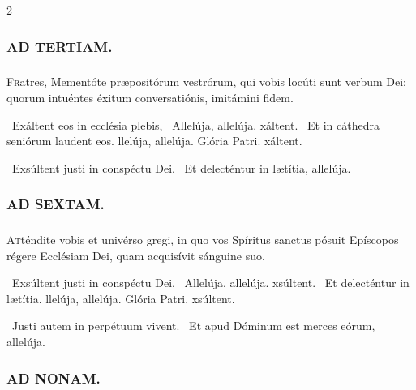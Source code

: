 \documentclass[9pt,twoside]{extarticle}
\begin{document}
\begin{multicols}{2}
\begin{tightlist}{}
\item {}
\end{tightlist}

\subsubsection*{\center \textsc{AD TERTIAM.}}
\subsubsection*{}
\lettrine{F}ratres, Mementóte præpositórum vestrórum, qui vobis locúti sunt verbum Dei: quorum intuéntes éxitum conversatiónis, imitámini fidem.

\begin{tightlist}{}
\item {}~Exáltent eos in ecclésia plebis, \textred{*}~Allelúja, allelúja. xáltent. ~Et in cáthedra seniórum laudent eos. llelúja, allelúja. Glória Patri. xáltent.
\item {}~Exsúltent justi in conspéctu Dei. ~Et delecténtur in lætítia, allelúja.
\end{tightlist}

\subsubsection*{\center \textsc{AD SEXTAM.}}
\subsubsection*{}
\lettrine{A}tténdite vobis et univérso gregi, in quo vos Spíritus sanctus pósuit Epíscopos régere Ecclésiam Dei, quam acquisívit sánguine suo.

\begin{tightlist}{}
\item {}~Exsúltent justi in conspéctu Dei, \textred{*}~Allelúja, allelúja. xsúltent. ~Et delecténtur in lætítia. llelúja, allelúja. Glória Patri. xsúltent.
\item {}~Justi autem in perpétuum vivent. ~Et apud Dóminum est merces eórum, allelúja.
\end{tightlist}

\subsubsection*{\center \textsc{AD NONAM.}}

\end{multicols}
\end{document}
